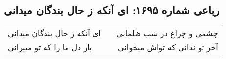 \begin{center}
\section*{رباعی شماره ۱۶۹۵: ای آنکه ز حال بندگان میدانی}
\label{sec:1695}
\begin{longtable}{l p{0.5cm} r}
ای آنکه ز حال بندگان میدانی
&&
چشمی و چراغ در شب ظلمانی
\\
باز دل ما را که تو میپرانی
&&
آخر تو ندانی که تواش میخوانی
\\
\end{longtable}
\end{center}
